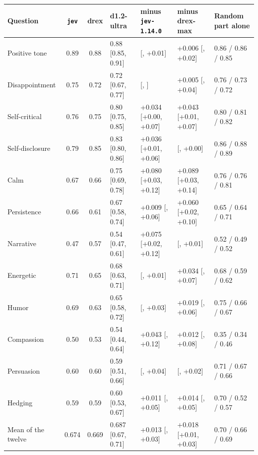 {\scriptsize\setlength{\tabcolsep}{3.5pt}
\begin{tabular}{@{}l cc l l l l@{}}
\toprule
Question & \texttt{jev} & drex & d1.2-ultra & minus \texttt{jev-1.14.0} & minus drex-max & Random part alone \\
\midrule
Positive tone & 0.89 & 0.88 & 0.88 {\scriptsize[0.85, 0.91]} & \textminus 0.009 {\scriptsize[\textminus 0.03, +0.01]} & +0.006 {\scriptsize[\textminus 0.01, +0.02]} & 0.86 / 0.86 / 0.85 \\
Disappointment & 0.75 & 0.72 & 0.72 {\scriptsize[0.67, 0.77]} & \textminus 0.034 {\scriptsize[\textminus 0.07, \textminus 0.00]} & +0.005 {\scriptsize[\textminus 0.03, +0.04]} & 0.76 / 0.73 / 0.72 \\
Self-critical & 0.76 & 0.75 & 0.80 {\scriptsize[0.75, 0.85]} & +0.034 {\scriptsize[+0.00, +0.07]} & +0.043 {\scriptsize[+0.01, +0.07]} & 0.80 / 0.81 / 0.82 \\
Self-disclosure & 0.79 & 0.85 & 0.83 {\scriptsize[0.80, 0.86]} & +0.036 {\scriptsize[+0.01, +0.06]} & \textminus 0.021 {\scriptsize[\textminus 0.04, +0.00]} & 0.86 / 0.88 / 0.89 \\
Calm & 0.67 & 0.66 & 0.75 {\scriptsize[0.69, 0.78]} & +0.080 {\scriptsize[+0.03, +0.12]} & +0.089 {\scriptsize[+0.03, +0.14]} & 0.76 / 0.76 / 0.81 \\
Persistence & 0.66 & 0.61 & 0.67 {\scriptsize[0.58, 0.74]} & +0.009 {\scriptsize[\textminus 0.04, +0.06]} & +0.060 {\scriptsize[+0.02, +0.10]} & 0.65 / 0.64 / 0.71 \\
Narrative & 0.47 & 0.57 & 0.54 {\scriptsize[0.47, 0.61]} & +0.075 {\scriptsize[+0.02, +0.12]} & \textminus 0.028 {\scriptsize[\textminus 0.06, +0.01]} & 0.52 / 0.49 / 0.52 \\
Energetic & 0.71 & 0.65 & 0.68 {\scriptsize[0.63, 0.71]} & \textminus 0.033 {\scriptsize[\textminus 0.07, +0.01]} & +0.034 {\scriptsize[\textminus 0.00, +0.07]} & 0.68 / 0.59 / 0.62 \\
Humor & 0.69 & 0.63 & 0.65 {\scriptsize[0.58, 0.72]} & \textminus 0.045 {\scriptsize[\textminus 0.10, +0.03]} & +0.019 {\scriptsize[\textminus 0.02, +0.06]} & 0.75 / 0.66 / 0.67 \\
Compassion & 0.50 & 0.53 & 0.54 {\scriptsize[0.44, 0.64]} & +0.043 {\scriptsize[\textminus 0.02, +0.12]} & +0.012 {\scriptsize[\textminus 0.04, +0.08]} & 0.35 / 0.34 / 0.46 \\
Persuasion & 0.60 & 0.60 & 0.59 {\scriptsize[0.51, 0.66]} & \textminus 0.011 {\scriptsize[\textminus 0.05, +0.04]} & \textminus 0.013 {\scriptsize[\textminus 0.04, +0.02]} & 0.71 / 0.67 / 0.66 \\
Hedging & 0.59 & 0.59 & 0.60 {\scriptsize[0.53, 0.67]} & +0.011 {\scriptsize[\textminus 0.03, +0.05]} & +0.014 {\scriptsize[\textminus 0.02, +0.05]} & 0.70 / 0.52 / 0.57 \\
\midrule
Mean of the twelve & 0.674 & 0.669 & 0.687 {\scriptsize[0.67, 0.71]} & +0.013 {\scriptsize[\textminus 0.00, +0.03]} & +0.018 {\scriptsize[+0.01, +0.03]} & 0.70 / 0.66 / 0.69 \\
\bottomrule
\end{tabular}}
